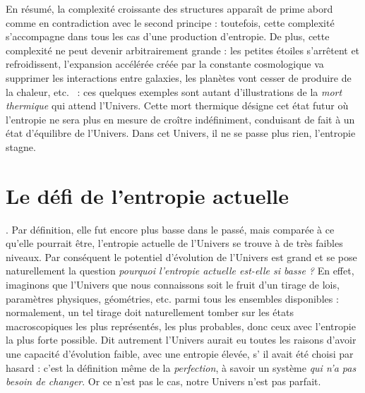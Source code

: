 En résumé, la complexité croissante des structures apparaît de prime abord comme en contradiction avec le second principe : toutefois, cette complexité s'accompagne dans tous les cas d'une production d'entropie. De plus, cette complexité ne peut devenir arbitrairement grande : les petites étoiles s'arrêtent et refroidissent, l'expansion accélérée créée par la constante cosmologique va supprimer les interactions entre galaxies, les planètes vont cesser de produire de la chaleur, etc. ~: ces quelques exemples sont autant d'illustrations de la \textit{mort thermique} qui attend l'Univers. Cette mort thermique désigne cet état futur où l'entropie ne sera plus en mesure de croître indéfiniment, conduisant de fait à un état d'équilibre de l'Univers. Dans cet Univers, il ne se passe plus rien, l'entropie stagne.

\section{Le défi de l'entropie actuelle}

. Par définition, elle fut encore plus basse dans le passé, mais comparée à ce qu'elle pourrait être, l'entropie actuelle de l'Univers se trouve à de très faibles niveaux. Par conséquent le potentiel d'évolution de l'Univers est grand et se pose naturellement la question \textit{pourquoi l'entropie actuelle est-elle si basse ?} En effet, imaginons que l'Univers que nous connaissons soit le fruit d'un tirage de lois, paramètres physiques, géométries, etc. parmi tous les ensembles disponibles : normalement, un tel tirage doit naturellement tomber sur les états macroscopiques les plus représentés, les plus probables, donc ceux avec l'entropie la plus forte possible. Dit autrement l'Univers aurait eu toutes les raisons d'avoir une capacité d'évolution faible, avec une entropie élevée, s’ il avait été choisi par hasard : c’est la définition même de la \textit{perfection}, à savoir un système \textit{qui n'a pas besoin de changer}. Or ce n'est pas le cas, notre Univers n'est pas parfait.

